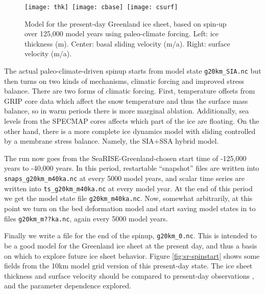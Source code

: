 \begin{figure}[ht]
\centering
\mbox{\texttt{[image: thk]}
  \qquad \texttt{[image: cbase]}
  \qquad \texttt{[image: csurf]}}
\caption{Model for the present-day Greenland ice sheet, based on spin-up over 125,000 model years using paleo-climate forcing.  Left: ice thickness (m).  Center: basal sliding velocity (m/a).  Right: surface velocity (m/a).}
\label{fig:sr-spindone-map}
\end{figure}


The actual paleo-climate-driven spinup starts from model state \texttt{g20km_SIA.nc} but then turns on two kinds of mechanisms, climatic forcing and improved stress balance.  There are two forms of climatic forcing. First, temperature offsets from GRIP core data which affect the snow temperature and thus the surface mass balance, so in warm periods there is more marginal ablation.  Additionally, sea levels from the SPECMAP cores affects which part of the ice are floating.  On the other hand, there is a more complete ice dynamics model with sliding controlled by a membrane stress balance.  Namely, the SIA+SSA hybrid model.

The run now goes from the SeaRISE-Greenland-chosen start time of -125,000 years to -40,000 years.  In this period, restartable ``snapshot'' files are written into \texttt{snaps_g20km_m40ka.nc} at every 5000 model years, and scalar time series are written into \texttt{ts_g20km_m40ka.nc} at every model year.  At the end of this period we get the model state file \texttt{g20km_m40ka.nc}.  Now, somewhat arbitrarily, at this point we turn on the bed deformation model and start saving model states in to files \texttt{g20km_m??ka.nc}, again every 5000 model years.

Finally we write a file for the end of the spinup, \texttt{g20km_0.nc}.  This is intended to be a good model for the Greenland ice sheet at the present day, and thus a basis on which to explore future ice sheet behavior.  Figure \ref{fig:sr-spinstart} shows some fields from the 10km model grid version of this present-day state.  The ice sheet thickness and surface velocity should be compared to present-day observations \cite{BKAJS}, and the parameter dependence explored.

